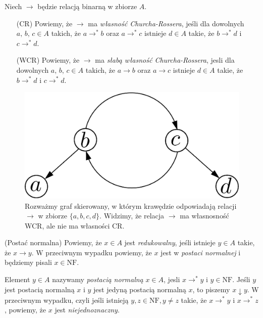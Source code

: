 \begin{definicja}
  Niech \(\to\) będzie relacją binarną w zbiorze \(A\). 
\begin{enumerate}
  \setlength\itemsep{0em}
  \item[(CR) ] Powiemy, że \(\to\) ma \emph{własność Churcha-Rossera}, jeśli
               dla dowolnych \(a,\,b,\,c\in A\) takich, że
               \(a\to^{*}b\) oraz \(a\to^{*} c\) istnieje \(d\in A\)
               takie, że \(b\to^{*} d\) i \(c\to^{*} d\).\label{def:cr_property_untyped}

  \item[(WCR)] Powiemy, że \(\to\) ma \emph{słabą własność 
               Churcha-Rossera}, jesli dla dowolnych \(a,\,b,\,c\in A\)
               takich, że \(a\to b\) oraz \(a\to c\) istnieje \(d\in A\) 
               takie, że \(b\to^{*} d\) i \(c\to^{*} d\).\label{def:wcr_property_untyped}

\end{enumerate}
\end{definicja}

\begin{figure}[!h]
  \centering
  \includegraphics[width=0.32\linewidth]{../wcrnotcr_example}
  \caption{Rozważmy graf skierowany, w którym krawędzie odpowiadają relacji \(\to\) w zbiorze \(\{a,b,c,d\}\). Widzimy, że relacja \(\to\) ma własnosność WCR, ale nie ma własności CR.}
\end{figure}

\begin{definicja}(Postać normalna)
  Powiemy, że \(x\in A\) jest \emph{redukowalny}, jeśli istnieje \(y\in A\) takie, że \(x\to y\). W przeciwnym wypadku powiemy, że \(x\) jest w \emph{postaci normalnej} i będziemy pisali \(x\in\mathrm{NF}\). 
  
  Element \(y\in A\) nazywamy \emph{postacią normalną} \(x\in A\), jesli \(x\to^{*}y\) i \(y\in\mathrm{NF}\). Jeśli \(y\) jest postacią normalną \(x\) i \(y\) jest jedyną postacią normalną \(x\), to piszemy \(x\downarrow y\). W przeciwnym wypadku, czyli jeśli istnieją \(y, z\in \mathrm{NF}, y\neq z\) takie, że \(x\to^{*} y\) i \(x\to^{*} z\), powiemy, że \(x\) jest \emph{niejednoznaczny}. 
\end{definicja}


